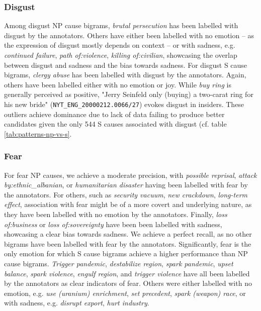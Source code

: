 \subsubsection{Disgust}

Among disgust NP cause bigrams, \textit{brutal persecution} has been labelled with disgust by the annotators. Others have either been labelled with no emotion -- as the expression of disgust mostly depends on context -- or with sadness, e.g. \textit{continued failure}, \textit{path of:violence}, \textit{killing of:civilian}, showcasing the overlap between disgust and sadness and the bias towards sadness. For disgust S cause bigrams, \textit{clergy abuse} has been labelled with disgust by the annotators. Again, others have been labelled either with no emotion or joy. While \textit{buy ring} is generally perceived as positive, "Jerry Seinfeld only (buying) a two-carat ring for his new bride" (\texttt{NYT\_ENG\_20000212.0066/27}) evokes disgust in insiders. These outliers achieve dominance due to lack of data failing to produce better candidates given the only 544 S causes associated with disgust (cf. table \ref{tab:patterns-np-vs-s}.

\subsubsection{Fear}

For fear NP causes, we achieve a moderate precision, with \textit{possible reprisal}, \textit{attack by:ethnic\_albanian}, or \textit{humanitarian disaster} having been labelled with fear by the annotators. For others, such as \textit{security vacuum}, \textit{new crackdown}, \textit{long-term effect}, association with fear might be of a more covert and underlying nature, as they have been labelled with no emotion by the annotators. Finally, \textit{loss of:business} or \textit{loss of:sovereignty} have been been labelled with sadness, showcasing a clear bias towards sadness. We achieve a perfect recall, as no other bigrams have been labelled with fear by the annotators.
Significantly, fear is the only emotion for which S cause bigrams achieve a higher performance than NP cause bigrams. \textit{Trigger pandemic}, \textit{destabilize region}, \textit{spark pandemic}, \textit{upset balance}, \textit{spark violence}, \textit{engulf region}, and \textit{trigger violence} have all been labelled by the annotators as clear indicators of fear. Others were either labelled with no emotion, e.g. \textit{use (uranium) enrichment}, \textit{set precedent}, \textit{spark (weapon) race}, or with sadness, e.g. \textit{disrupt export}, \textit{hurt industry}.

